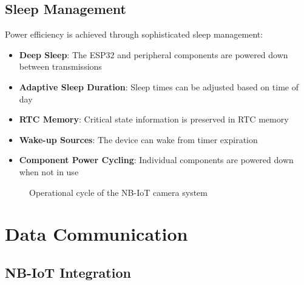 \documentclass[11pt,a4paper]{article}
\begin{document}
\subsection{Sleep Management}

Power efficiency is achieved through sophisticated sleep management:

\begin{itemize}
    \item \textbf{Deep Sleep}: The ESP32 and peripheral components are powered down between transmissions
    \item \textbf{Adaptive Sleep Duration}: Sleep times can be adjusted based on time of day
    \item \textbf{RTC Memory}: Critical state information is preserved in RTC memory
    \item \textbf{Wake-up Sources}: The device can wake from timer expiration
    \item \textbf{Component Power Cycling}: Individual components are powered down when not in use
\end{itemize}

\begin{figure}[h]
\centering
{}
\caption{Operational cycle of the NB-IoT camera system}
\label{fig:cycle}
\end{figure}

\section{Data Communication}

\subsection{NB-IoT Integration}
\end{document}
